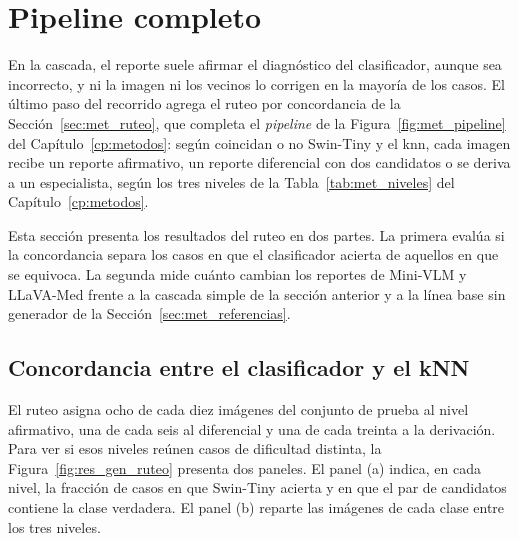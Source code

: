 \section{Pipeline completo}
\label{sec:res_gen_incertidumbre}

En la cascada, el reporte suele afirmar el diagnóstico del clasificador, aunque sea incorrecto, y ni la imagen ni los vecinos lo corrigen en la mayoría de los casos. El último paso del recorrido agrega el ruteo por concordancia de la Sección~\ref{sec:met_ruteo}, que
completa el \emph{pipeline} de la Figura~\ref{fig:met_pipeline} del Capítulo~\ref{cp:metodos}: según coincidan o no
Swin-Tiny y el \gls{knn}, cada imagen recibe un reporte afirmativo, un reporte diferencial con dos candidatos o se
deriva a un especialista, según los tres niveles de la Tabla~\ref{tab:met_niveles} del Capítulo~\ref{cp:metodos}.

Esta sección presenta los resultados del ruteo en dos partes. La primera evalúa si la concordancia separa los casos en
que el clasificador acierta de aquellos en que se equivoca. La segunda mide cuánto cambian los reportes de Mini-VLM y
LLaVA-Med frente a la cascada simple de la sección anterior y a la línea base sin generador de la
Sección~\ref{sec:met_referencias}.

\subsection{Concordancia entre el clasificador y el kNN}
\label{sec:res_gen_concordancia}

El ruteo asigna ocho de cada diez imágenes del conjunto de prueba al nivel afirmativo, una de cada seis al diferencial y una
de cada treinta a la derivación. Para ver si esos niveles reúnen casos de dificultad distinta, la Figura~\ref{fig:res_gen_ruteo} presenta dos paneles. El
panel (a) indica, en cada nivel, la fracción de casos en que Swin-Tiny acierta y en que el par de candidatos contiene la
clase verdadera. El panel (b) reparte las imágenes de cada clase entre los tres niveles.

